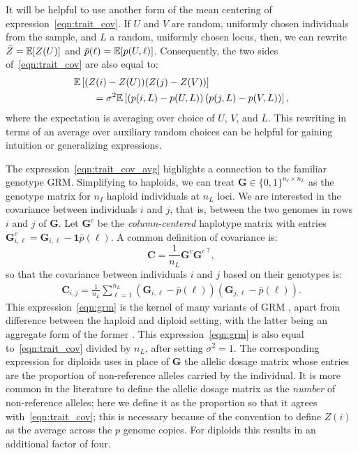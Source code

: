 It will be helpful to use another form of the mean centering
of expression~\eqref{eqn:trait_cov}.
%
If $U$ and $V$ are random, uniformly chosen individuals from the sample,
and $L$ a random, uniformly chosen locus,
then, we can rewrite $\bar Z = \mathbb{E}[Z(U)]$ and $\bar p(\ell) = \mathbb{E}[p(U,\ell)]$.
%
Consequently, the two sides of~\eqref{eqn:trait_cov}
are also equal to:
%
\begin{align} \label{eqn:trait_cov_avg}
    \begin{split}
        &\mathbb{E}\left[(Z(i) - Z(U))(Z(j) - Z(V)\right)] \\
        &\qquad = \sigma^2 \mathbb{E}\left[
            \left(p(i,L) - p(U,L)\right) \left(p(j,L) - p(V,L)\right)
        \right] ,
    \end{split}
\end{align}
%
where the expectation is averaging over choice of $U$, $V$, and $L$.
%
This rewriting in terms of an average over auxiliary random choices
can be helpful for gaining intuition or generalizing expressions.


The expression~\eqref{eqn:trait_cov_avg}
highlights a connection to the familiar genotype GRM.
%
Simplifying to haploids, we can treat
$\mathbf{G} \in \{0, 1\}^{n_I \times n_L}$ as the genotype matrix
for $n_I$ haploid individuals at $n_L$ loci.
%
We are interested in the covariance between individuals $i$ and $j$,
that is, between the two genomes in rows $i$ and $j$ of $\mathbf{G}$.
%
Let $\mathbf{G}^c$ be the \textit{column-centered} haplotype matrix with
entries $\mathbf{G}^c_{i,\ell} = \mathbf{G}_{i,\ell} - \mathbf{1}\bar{p}(\ell)$.
%
A common definition of covariance is:
% 
\[ \mathbf{C} = \frac{1}{n_L}\mathbf{G}^c{\mathbf{G}^c}^\intercal, \]
%
so that the covariance between individuals $i$ and $j$ based on their genotypes is:
%
\begin{align} \label{eqn:grm}
    \mathbf{C}_{i,j} = \frac{1}{n_L} \sum_{\ell=1}^{n_L} (\mathbf{G}_{i,\ell} - \bar{p}(\ell))(\mathbf{G}_{j,\ell} - \bar{p}(\ell)).
\end{align}
%
This expression~\eqref{eqn:grm} is the kernel of many variants of GRM
\citep{vanraden2008efficient, yang2010common, speed2015relatedness},
apart from difference between the haploid and diploid setting,
with the latter being an aggregate form of the former
\citep{cockerham1976group, smith1985efficient}.
%
This expression~\eqref{eqn:grm} is also equal to~\eqref{eqn:trait_cov}
divided by $n_L$, after setting $\sigma^2=1$.
%
The corresponding expression for diploids uses
in place of $\mathbf{G}$ the allelic dosage matrix
whose entries are the proportion of non-reference alleles carried by the individual.
It is more common in the literature to define the allelic dosage matrix
as the \emph{number} of non-reference alleles;
here we define it as the proportion so that it agrees with~\eqref{eqn:trait_cov};
this is necessary because 
of the convention to define $Z(i)$ as the average across the $p$ genome copies.
For diploids this results in an additional factor of four.

